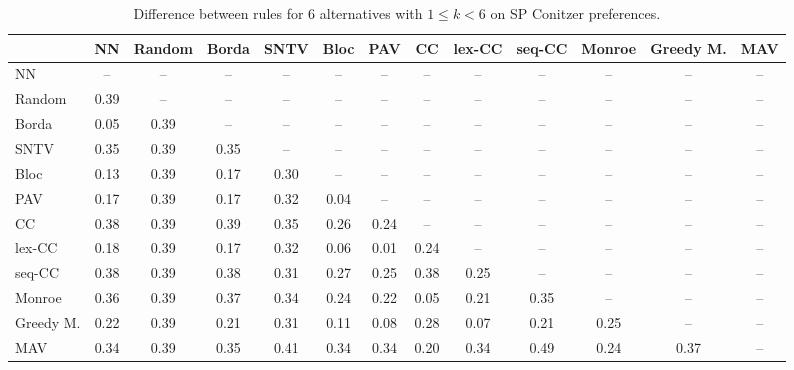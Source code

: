 
\begin{table*}[htbp]
\centering
\begin{tabular}{lcccccccccccc}
\toprule
 & NN & Random & Borda & SNTV & Bloc & PAV & CC & lex-CC & seq-CC & Monroe & Greedy M. & MAV \\
\midrule
NN & -- & -- & -- & -- & -- & -- & -- & -- & -- & -- & -- & -- \\
Random & \cellcolor{blue!39} 0.39 & -- & -- & -- & -- & -- & -- & -- & -- & -- & -- & -- \\
Borda & \cellcolor{blue!5} 0.05 & \cellcolor{blue!39} 0.39 & -- & -- & -- & -- & -- & -- & -- & -- & -- & -- \\
SNTV & \cellcolor{blue!35} 0.35 & \cellcolor{blue!39} 0.39 & \cellcolor{blue!35} 0.35 & -- & -- & -- & -- & -- & -- & -- & -- & -- \\
Bloc & \cellcolor{blue!13} 0.13 & \cellcolor{blue!39} 0.39 & \cellcolor{blue!17} 0.17 & \cellcolor{blue!30} 0.30 & -- & -- & -- & -- & -- & -- & -- & -- \\
PAV & \cellcolor{blue!17} 0.17 & \cellcolor{blue!39} 0.39 & \cellcolor{blue!17} 0.17 & \cellcolor{blue!32} 0.32 & \cellcolor{blue!4} 0.04 & -- & -- & -- & -- & -- & -- & -- \\
CC & \cellcolor{blue!38} 0.38 & \cellcolor{blue!39} 0.39 & \cellcolor{blue!39} 0.39 & \cellcolor{blue!35} 0.35 & \cellcolor{blue!26} 0.26 & \cellcolor{blue!24} 0.24 & -- & -- & -- & -- & -- & -- \\
lex-CC & \cellcolor{blue!18} 0.18 & \cellcolor{blue!39} 0.39 & \cellcolor{blue!17} 0.17 & \cellcolor{blue!32} 0.32 & \cellcolor{blue!6} 0.06 & \cellcolor{blue!1} 0.01 & \cellcolor{blue!24} 0.24 & -- & -- & -- & -- & -- \\
seq-CC & \cellcolor{blue!38} 0.38 & \cellcolor{blue!39} 0.39 & \cellcolor{blue!38} 0.38 & \cellcolor{blue!31} 0.31 & \cellcolor{blue!27} 0.27 & \cellcolor{blue!25} 0.25 & \cellcolor{blue!38} 0.38 & \cellcolor{blue!25} 0.25 & -- & -- & -- & -- \\
Monroe & \cellcolor{blue!36} 0.36 & \cellcolor{blue!39} 0.39 & \cellcolor{blue!37} 0.37 & \cellcolor{blue!34} 0.34 & \cellcolor{blue!24} 0.24 & \cellcolor{blue!22} 0.22 & \cellcolor{blue!5} 0.05 & \cellcolor{blue!21} 0.21 & \cellcolor{blue!35} 0.35 & -- & -- & -- \\
Greedy M. & \cellcolor{blue!22} 0.22 & \cellcolor{blue!39} 0.39 & \cellcolor{blue!21} 0.21 & \cellcolor{blue!31} 0.31 & \cellcolor{blue!11} 0.11 & \cellcolor{blue!8} 0.08 & \cellcolor{blue!28} 0.28 & \cellcolor{blue!7} 0.07 & \cellcolor{blue!21} 0.21 & \cellcolor{blue!25} 0.25 & -- & -- \\
MAV & \cellcolor{blue!34} 0.34 & \cellcolor{blue!39} 0.39 & \cellcolor{blue!35} 0.35 & \cellcolor{blue!41} 0.41 & \cellcolor{blue!34} 0.34 & \cellcolor{blue!34} 0.34 & \cellcolor{blue!20} 0.20 & \cellcolor{blue!34} 0.34 & \cellcolor{blue!49} 0.49 & \cellcolor{blue!24} 0.24 & \cellcolor{blue!37} 0.37 & -- \\
\bottomrule
\end{tabular}

\caption{Difference between rules for 6 alternatives with $1 \leq k < 6$ on SP Conitzer preferences.}
\label{tab:rule_distance_heatmap-m=[6]-pref_dist=single_peaked_conitzer}
\end{table*}
    